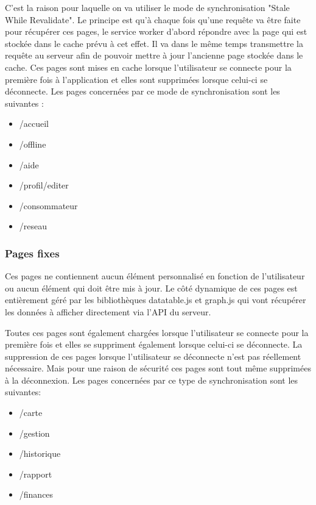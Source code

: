 \documentclass{EPL-master-thesis-covers-FR}
\begin{document}
				 	C'est la raison pour laquelle on va utiliser le mode de synchronisation "Stale While Revalidate". Le principe est qu'à chaque fois qu'une requête va être faite pour récupérer ces pages, le service worker d'abord répondre avec la page qui est stockée dans le cache prévu à cet effet. Il va dans le même temps transmettre la requête au serveur afin de pouvoir mettre à jour l'ancienne page stockée dans le cache. Ces pages sont mises en cache lorsque l'utilisateur se connecte pour la première fois à l'application et elles sont supprimées lorsque celui-ci se déconnecte. Les pages concernées par ce mode de synchronisation sont les suivantes :
				 	\begin{itemize}
				 		\item /accueil
				 		\item /offline
				 		\item /aide
				 		\item /profil/editer
				 		\item /consommateur
				 		\item /reseau
				 	\end{itemize}
				 	
				\subsubsection*{Pages fixes} 
					Ces pages ne contiennent aucun élément personnalisé en fonction de l'utilisateur ou aucun élément qui doit être mis à jour. Le côté dynamique de ces pages est entièrement géré par les bibliothèques datatable.js et graph.js qui vont récupérer les données à afficher directement via l'API du serveur. 
				
					Toutes ces pages sont également chargées lorsque l'utilisateur se connecte pour la première fois et elles se suppriment également lorsque celui-ci se déconnecte. La suppression de ces pages lorsque l'utilisateur se déconnecte n'est pas réellement nécessaire. Mais pour une raison de sécurité ces pages sont tout même supprimées à la déconnexion. Les pages concernées par ce type de synchronisation sont les suivantes:
					\begin{itemize}
						\item /carte
						\item /gestion
						\item /historique
						\item /rapport
						\item /finances
					\end{itemize}					
				
\end{document}
